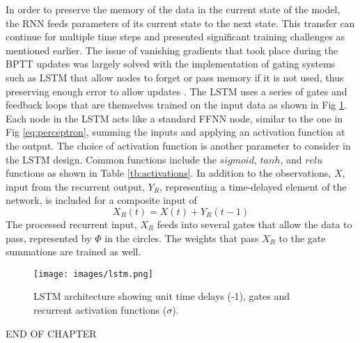 In order to preserve the memory of the data in the current state of the model, the RNN feeds parameters of its current state to the next state. This transfer can continue for multiple time steps and presented significant training challenges as mentioned earlier. The issue of vanishing gradients that took place during the BPTT updates was largely solved with the implementation of gating systems such as LSTM that allow nodes to forget or pass memory if it is not used, thus preserving enough error to allow updates \citep{Hochreiter1997}. The LSTM uses a series of gates and feedback loops that are themselves trained on the input data as shown in Fig \ref{fig:lstm}. Each node in the LSTM acts like a standard FFNN node, similar to the one in Fig \ref{eq:perceptron}, summing the inputs and applying an activation function at the output. The choice of activation function is another parameter to consider in the LSTM design. Common functions include the $sigmoid$, $tanh$, and $relu$ functions as shown in Table \ref{tb:activations}. In addition to the observations, $X$, input from the recurrent output, $Y_{R}$, representing a time-delayed element of the network, is included for a composite input of 
%
\begin{equation}
\label{eq:Xr}
X_{R}(t) = X(t) + Y_{R}(t-1)
\end{equation}
%
The processed recurrent input, $X_{R}$ feeds into several gates that allow the data to pass, represented by $\Phi$ in the circles. The weights that pass $X_{R}$ to the gate summations are trained as well.
%
\begin{figure}[H]
\centering
\texttt{[image: images/lstm.png]} 
\caption[LSTM architecture]{LSTM architecture showing unit time delays (-1), gates and recurrent activation functions ($\sigma$).}
\label{fig:lstm}
\end{figure}

%

\bigskip
\begin{center}
END OF CHAPTER
\end{center}